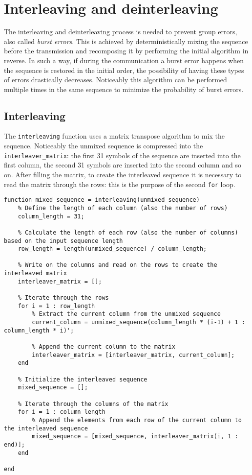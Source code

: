 \vspace{40px} \section{Interleaving and deinterleaving} \label{interleaving}
The interleaving and deinterleaving process is needed to prevent group errors, also called \textsl{burst errors}. This is achieved by deterministically mixing the sequence before the transmission and recomposing it by performing the initial algorithm in reverse. In such a way, if during the communication a burst error happens when the sequence is restored in the initial order, the possibility of having these types of errors drastically decreases. Noticeably this algorithm can be performed multiple times in the same sequence to minimize the probability of burst errors.


\subsection{Interleaving}
The \texttt{interleaving} function uses a matrix transpose algorithm to mix the sequence. Noticeably the unmixed sequence is compressed into the \texttt{interleaver\_matrix}: the first 31 symbols of the sequence are inserted into the first column, the second 31 symbols are inserted into the second column and so on. After filling the matrix, to create the interleaved sequence it is necessary to read the matrix through the rows: this is the purpose of the second \texttt{for} loop.

\begin{lstlisting}
function mixed_sequence = interleaving(unmixed_sequence)
    % Define the length of each column (also the number of rows)
    column_length = 31;

    % Calculate the length of each row (also the number of columns) based on the input sequence length
    row_length = length(unmixed_sequence) / column_length;

    % Write on the columns and read on the rows to create the interleaved matrix
    interleaver_matrix = [];

    % Iterate through the rows
    for i = 1 : row_length
        % Extract the current column from the unmixed sequence
        current_column = unmixed_sequence(column_length * (i-1) + 1 : column_length * i)';
        
        % Append the current column to the matrix
        interleaver_matrix = [interleaver_matrix, current_column];
    end
    
    % Initialize the interleaved sequence
    mixed_sequence = [];

    % Iterate through the columns of the matrix
    for i = 1 : column_length
        % Append the elements from each row of the current column to the interleaved sequence
        mixed_sequence = [mixed_sequence, interleaver_matrix(i, 1 : end)];
    end

end
\end{lstlisting}

